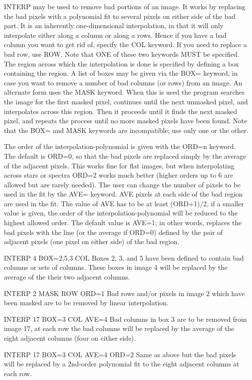 INTERP may be used to remove bad portions of an image.  It works by
replacing the bad pixels with a polynomial fit to several pixels on either
side of the bad part.  It is an inherently one-dimensional interpolation,
in that it will only interpolate either along a column or along a rows.
Hence if you have a bad column you want to get rid of, specify the COL
keyword.  If you need to replace a bad row, use ROW.  Note that ONE of
these two keywords MUST be specified. The region across which the
interpolation is done is specified by defining a box containing the
region. A list of boxes may be given via the BOX= keyword, in case you want
to remove a number of bad columns (or rows) from an image.  An alternate
form uses the MASK keyword.  When this is used the program searches the
image for the first masked pixel, continues until the next unmasked pixel,
and interpolates across this region.  Then it proceeds until it finds the
next masked pixel, and repeats the process until no more masked pixels have
been found.  Note that the BOX= and MASK keywords are incompatible; use
only one or the other.

The order of the interpolation-polynomial is given with the ORD=n
keyword. The default is ORD=0, so that the bad pixels are replaced simply
by the average of the adjacent pixels. This works fine for flat images, but
when interpolating across stars or spectra ORD=2 works much better (higher
orders up to 6 are allowed but are rarely needed).  The user can change the
number of pixels to be used in the fit by the AVE= keyword.  AVE pixels at
each side of the bad region are used in the fit.  The value of AVE has to
be at least (ORD+1)/2, if a smaller value is given, the order of the
interpolation-polynomial will be reduced to the highest allowed order. The
default value is AVE=1; in other words, replaces the bad pixels with the
line (or the average if ORD=0) defined by the pair of adjacent pixels (one
pixel on either side) of the bad region.

\begin{example}
  \item[INTERP 4 BOX=2,5,3 COL\hfill]{Boxes 2, 3, and 5 have been defined
       to contain bad columns or sets of columns.  These boxes in image 4
       will be replaced by the average of the their two adjacent columns.}

  \item[INTERP 2 MASK ROW ORD=1\hfill]{Bad rows and/or pixels in image 2
       which have been masked are to be removed by linear interpolation.}

  \item[INTERP 17 BOX=3 COL AVE=4\hfill]{Bad columns in box 3 are to be
       removed from image 17, at each row the bad columns will be replaced
       by the average of the eight adjacent columns (four on either side).}

  \item[INTERP 17 BOX=3 COL AVE=4 ORD=2\hfill]{Same as above but the bad
       pixels will be replaced by a 2nd-order polynomial fit to the eight
       adjacent columns at each row.}
\end{example}

